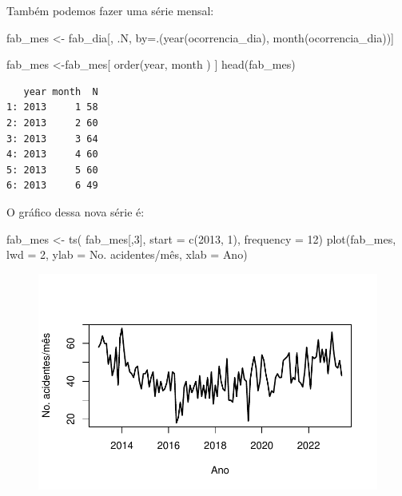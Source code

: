 \documentclass[
  letterpaper,
  DIV=11,
  numbers=noendperiod]{scrreprt}
\newenvironment{Shaded}{\begin{snugshade}}{\end{snugshade}}
\newcommand{\AttributeTok}[1]{\textcolor[rgb]{0.40,0.45,0.13}{#1}}
\newcommand{\DecValTok}[1]{\textcolor[rgb]{0.68,0.00,0.00}{#1}}
\newcommand{\FunctionTok}[1]{\textcolor[rgb]{0.28,0.35,0.67}{#1}}
\newcommand{\NormalTok}[1]{\textcolor[rgb]{0.00,0.23,0.31}{#1}}
\newcommand{\OtherTok}[1]{\textcolor[rgb]{0.00,0.23,0.31}{#1}}
\newcommand{\StringTok}[1]{\textcolor[rgb]{0.13,0.47,0.30}{#1}}
\begin{document}
Também podemos fazer uma série mensal:

\begin{Shaded}
\begin{Highlighting}[]
\NormalTok{fab\_mes }\OtherTok{\textless{}{-}}\NormalTok{ fab\_dia[, .N, by}\OtherTok{=}\NormalTok{.(}\FunctionTok{year}\NormalTok{(ocorrencia\_dia), }\FunctionTok{month}\NormalTok{(ocorrencia\_dia))]}

\NormalTok{fab\_mes }\OtherTok{\textless{}{-}}\NormalTok{fab\_mes[ }\FunctionTok{order}\NormalTok{(year, month ) ]}
\FunctionTok{head}\NormalTok{(fab\_mes)}
\end{Highlighting}
\end{Shaded}

\begin{verbatim}
   year month  N
1: 2013     1 58
2: 2013     2 60
3: 2013     3 64
4: 2013     4 60
5: 2013     5 60
6: 2013     6 49
\end{verbatim}

O gráfico dessa nova série é:

\begin{Shaded}
\begin{Highlighting}[]
\NormalTok{fab\_mes }\OtherTok{\textless{}{-}} \FunctionTok{ts}\NormalTok{( fab\_mes[,}\DecValTok{3}\NormalTok{], }\AttributeTok{start =} \FunctionTok{c}\NormalTok{(}\DecValTok{2013}\NormalTok{, }\DecValTok{1}\NormalTok{), }\AttributeTok{frequency =} \DecValTok{12}\NormalTok{)}
\FunctionTok{plot}\NormalTok{(fab\_mes, }\AttributeTok{lwd =} \DecValTok{2}\NormalTok{, }\AttributeTok{ylab =} \StringTok{\textquotesingle{}No. acidentes/mês\textquotesingle{}}\NormalTok{, }\AttributeTok{xlab =} \StringTok{\textquotesingle{}Ano\textquotesingle{}}\NormalTok{)}
\end{Highlighting}
\end{Shaded}

\begin{figure}[H]

{\centering \includegraphics{intro_files/figure-pdf/unnamed-chunk-12-1.pdf}

}

\end{figure}
\end{document}
